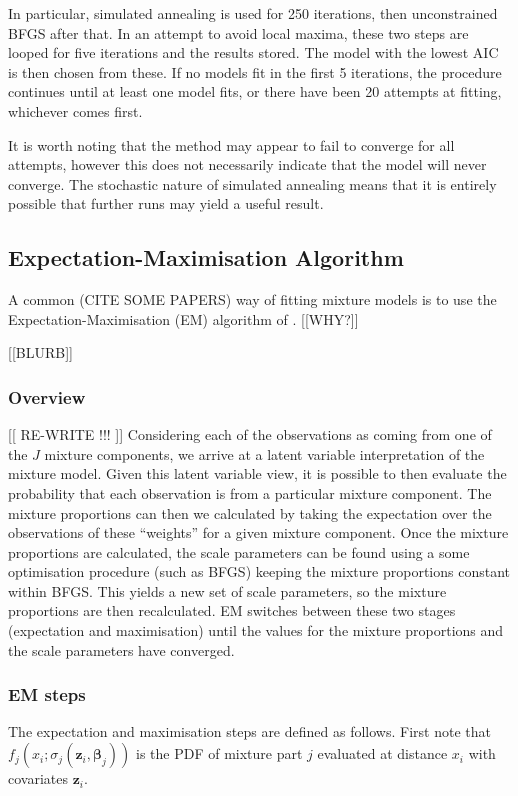 In particular, simulated annealing is used for 250 iterations, then unconstrained BFGS after that. In an attempt to avoid local maxima, these two steps are looped for five iterations and the results stored. The model with the lowest AIC is then chosen from these. If no models fit in the first 5 iterations, the procedure continues until at least one model fits, or there have been 20 attempts at fitting, whichever comes first.

It is worth noting that the method may appear to fail to converge for all attempts, however this does not necessarily indicate that the model will never converge. The stochastic nature of simulated annealing means that it is entirely possible that further runs may yield a useful result.

\subsection{Expectation-Maximisation Algorithm}
A common (CITE SOME PAPERS) way of fitting mixture models is to use the Expectation-Maximisation (EM) algorithm of \cite{em}. [[WHY?]]

[[BLURB]]

\subsubsection{Overview}

[[ RE-WRITE !!! ]]
Considering each of the observations as coming from one of the $J$ mixture components, we arrive at a latent variable interpretation of the mixture model. Given this latent variable view, it is possible to then evaluate the probability that each observation is from a particular mixture component. The mixture proportions can then we calculated by taking the expectation over the observations of these ``weights'' for a given mixture component. Once the mixture proportions are calculated, the scale parameters can be found using a some optimisation procedure (such as BFGS) keeping the mixture proportions constant within BFGS. This yields a new set of scale parameters, so the mixture proportions are then recalculated. EM switches between these two stages (expectation and maximisation) until the values for the mixture proportions and the scale parameters have converged.

\subsubsection{EM steps}
The expectation and maximisation steps are defined as follows. First note that $f_j(x_i;\sigma_j(\bm{z}_i,\bm{\beta}_j))$ is the PDF of mixture part $j$ evaluated at distance $x_i$ with covariates $\bm{z}_i$. 


